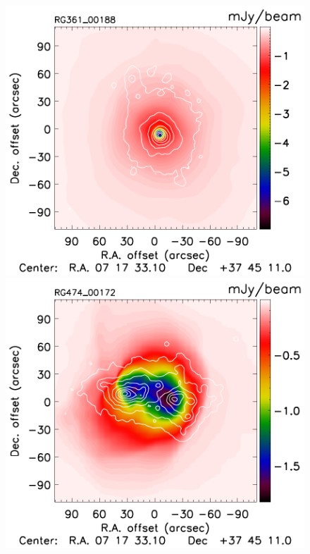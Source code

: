 \documentclass[twocolumn,traditabstract]{aa}
\begin{document}
\begin{figure}[h]
\includegraphics[trim=0cm 0.7cm 0cm 0cm, clip=true, totalheight=3.6cm]{Figure/Map_RG361_00188_Ymap_zobs0p6_raw.pdf}
\includegraphics[trim=0cm 0.7cm 0cm 0cm, clip=true, totalheight=3.6cm]{Figure/Map_RG474_00172_Ymap_zobs0p9_raw.pdf}

\end{figure}
\end{document}
